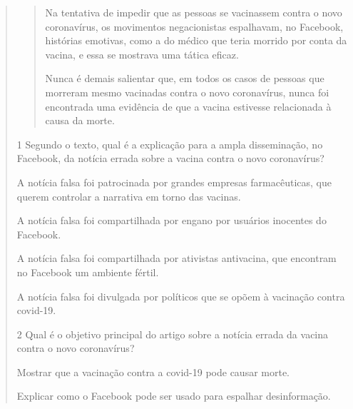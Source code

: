 \begin{quote}
\begin{quote}
Na tentativa de impedir que as pessoas se vacinassem contra o novo coronavírus,
os movimentos negacionistas espalhavam, no Facebook, histórias emotivas, como
a do médico que teria morrido por conta da vacina, e essa se mostrava uma
tática eficaz.

Nunca é demais salientar que, em todos os casos de pessoas que morreram
mesmo vacinadas contra o novo coronavírus, nunca foi encontrada uma evidência
de que a vacina estivesse relacionada à causa da morte.

\end{quote}

\num{1} Segundo o texto, qual é a explicação para a ampla
disseminação, no Facebook, da notícia errada sobre a vacina contra o novo coronavírus?

\begin{escolha}
\item A notícia falsa foi patrocinada por grandes empresas farmacêuticas,
que querem controlar a narrativa em torno das vacinas.

\item A notícia falsa foi compartilhada por engano por usuários inocentes
do Facebook.

\item A notícia falsa foi compartilhada por ativistas antivacina, que
encontram no Facebook um ambiente fértil.

\item A notícia falsa foi divulgada por políticos que se opõem à vacinação contra covid-19.
\end{escolha}


\num{2} Qual é o objetivo principal do artigo sobre a notícia errada da vacina
contra o novo coronavírus?

\begin{escolha}
\item Mostrar que a vacinação contra a covid-19 pode causar morte.

\item Explicar como o Facebook pode ser usado para espalhar desinformação.


\end{escolha}
\end{quote}
